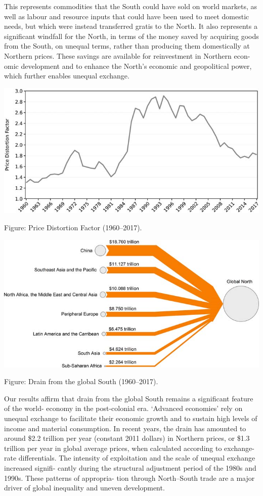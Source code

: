 \documentclass[
]{book}
\begin{document}
This represents commodities that the South could have sold on world markets, as well as labour
and resource inputs that could have been used to meet domestic needs, but which were instead
transferred gratis to the North. It also represents a significant windfall for the North, in terms of
the money saved by acquiring goods from the South, on unequal terms, rather than producing
them domestically at Northern prices. These savings are available for reinvestment in Northern econ-
omic development and to enhance the North's economic and geopolitical power, which further
enables unequal exchange.

\includegraphics{fig/Hickel_Price_Distortion_Factor.png}

Figure: Price Distortion Factor (1960--2017).

\includegraphics{fig/Hickel_Drain_from_Global_South.png}

Figure: Drain from the global South (1960--2017).

Our results affirm that drain from the global South remains a significant feature of the world-
economy in the post-colonial era. `Advanced economies' rely on unequal exchange to facilitate
their economic growth and to sustain high levels of income and material consumption. In recent
years, the drain has amounted to around \$2.2 trillion per year (constant 2011 dollars) in Northern
prices, or \$1.3 trillion per year in global average prices, when calculated according to exchange-
rate differentials. The intensity of exploitation and the scale of unequal exchange increased signifi-
cantly during the structural adjustment period of the 1980s and 1990s. These patterns of appropria-
tion through North--South trade are a major driver of global inequality and uneven development.
\end{document}
